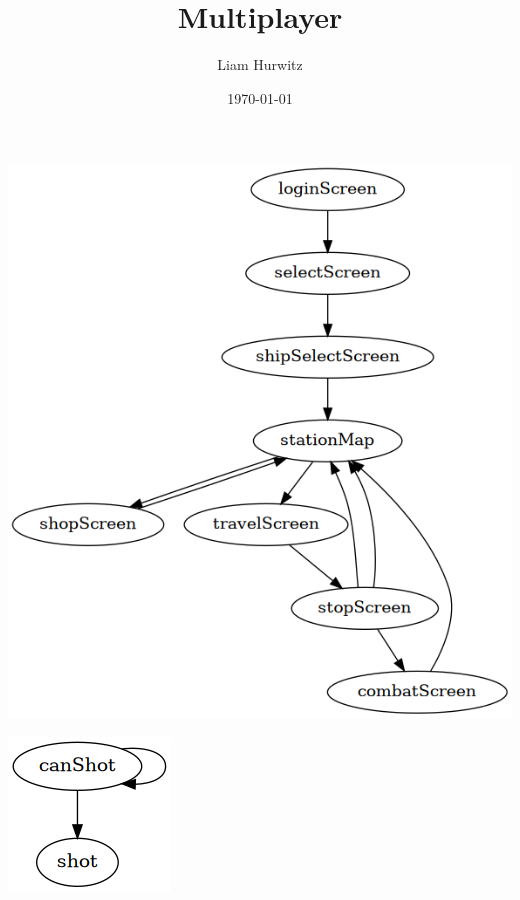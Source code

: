 \documentclass[11pt]{article}
\author{Liam Hurwitz}
\date{\today}
\title{Multiplayer}
\begin{document}
\maketitle
\tableofcontents

\begin{center}
\includegraphics[width=.9\linewidth]{multi1.png}
\end{center}


\begin{center}
\includegraphics[width=.9\linewidth]{multiFight.png}
\end{center}
\end{document}
